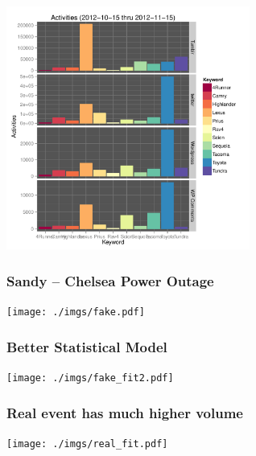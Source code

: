 \documentclass{beamer}
\begin{document}
\begin{frame}
  \begin{center}
    \includegraphics[width=8cm]{./imgs/bars.pdf}
  \end{center}
\end{frame}


\begin{frame}
\begin{center}
\end{center}
\end{frame}


\begin{frame}\frametitle{Sandy -- Chelsea Power Outage}
  \begin{center}
    \texttt{[image: ./imgs/fake.pdf]}
  \end{center}
\end{frame}


\begin{frame}\frametitle{Better Statistical Model}
  \begin{center}
    \texttt{[image: ./imgs/fake\_fit2.pdf]}
  \end{center}
\end{frame}

\begin{frame}\frametitle{Real event has much higher volume}
  \begin{center}
    \texttt{[image: ./imgs/real\_fit.pdf]}
  \end{center}
\end{frame}
\end{document}
